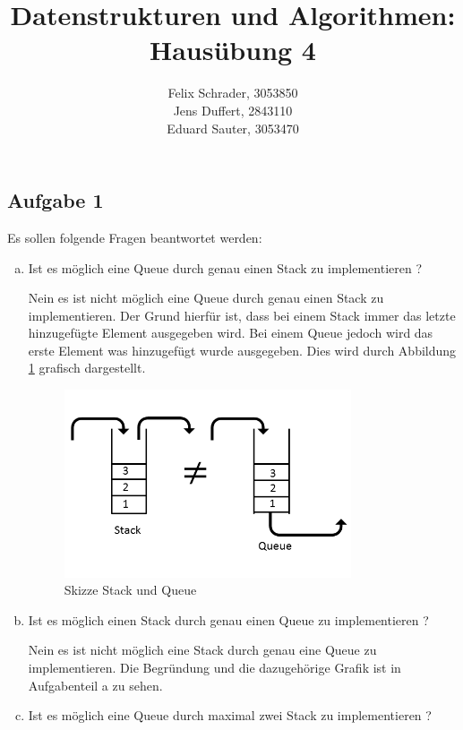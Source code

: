 \documentclass[11pt]{article}
\author{
  Felix Schrader, 3053850 \\ 
  Jens Duffert, 2843110 \\
  Eduard Sauter, 3053470
}
\title{Datenstrukturen und Algorithmen: Haus\"ubung 4}
\begin{document}
\maketitle
\subsection*{Aufgabe 1}
Es sollen folgende Fragen beantwortet  werden:\\
\begin{enumerate}[a)]
\item
Ist es möglich eine Queue durch genau einen Stack zu implementieren ?

Nein es ist nicht möglich eine Queue durch genau einen Stack zu implementieren.
Der Grund hierfür ist, dass bei einem Stack immer das letzte hinzugefügte 
Element ausgegeben wird. Bei einem Queue jedoch wird das erste Element was 
hinzugefügt wurde ausgegeben. Dies wird durch Abbildung \ref{fig:a11} grafisch dargestellt.
\begin{figure}[h!]
	\centering
	\includegraphics[width=0.8\textwidth]{datstrualgaufgabe11.png}
	\caption{Skizze Stack und Queue}
	\label{fig:a11}
\end{figure}
\item
Ist es möglich einen Stack durch genau einen Queue zu implementieren ?

Nein es ist nicht möglich eine Stack durch genau eine Queue zu implementieren. Die Begründung und die dazugehörige Grafik ist in Aufgabenteil a zu sehen. 

\item
Ist es möglich eine Queue durch maximal zwei Stack zu implementieren ?


\end{enumerate}
\end{document}
